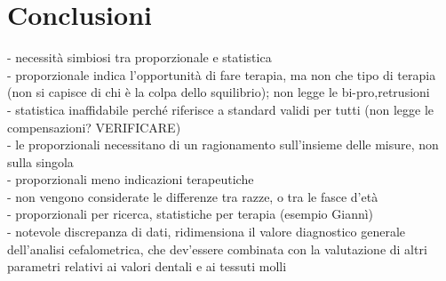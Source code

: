 \chapter{Conclusioni}

- necessità simbiosi tra proporzionale e statistica\\
- proporzionale indica l'opportunità di fare terapia, ma non che tipo di terapia (non si capisce di chi è la colpa dello squilibrio); non legge le bi-{pro,re}trusioni\\
- statistica inaffidabile perché riferisce a standard validi per tutti (non legge le compensazioni? VERIFICARE)\\
- le proporzionali necessitano di un ragionamento sull'insieme delle misure, non sulla singola\\
- proporzionali meno indicazioni terapeutiche\\
- non vengono considerate le differenze tra razze, o tra le fasce d'età\\
- proporzionali per ricerca, statistiche per terapia (esempio Giannì)\\
- notevole discrepanza di dati, ridimensiona il valore diagnostico generale dell'analisi cefalometrica, che dev'essere combinata con la valutazione di altri parametri relativi ai valori dentali e ai tessuti molli